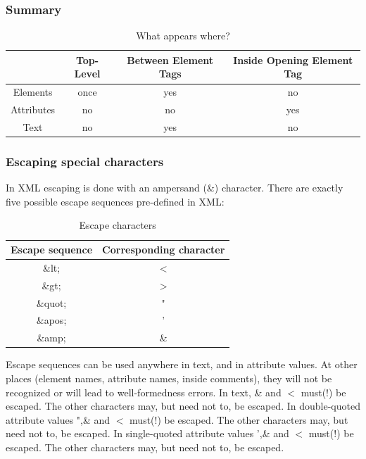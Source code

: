 \subsubsection{Summary}

\begin{table}[H]
    \centering
    \begin{tabular}{|c|c|c|c|}
        \hline
         & Top-Level & Between Element Tags & Inside Opening Element Tag \\ \hline
        Elements & once & yes & no \\ \hline
        Attributes & no & no & yes \\ \hline
        Text & no & yes & no \\ \hline
    \end{tabular}
    \caption{What appears where?}\label{tab:Waw}
\end{table}

\subsubsection{Escaping special characters}
In XML escaping is done with an ampersand (\&) character. There are exactly five possible escape sequences pre-defined in XML:
\begin{table}[H]
    \centering
    \begin{tabular}{cc}
        \hline
        Escape sequence & Corresponding character \\ \hline
        \&lt; & $<$ \\
        \&gt; & $>$ \\
        \&quot; & " \\
        \&apos; & ' \\
        \&amp; & \& \\ \hline
    \end{tabular}
    \caption{Escape characters}\label{tab:escchar}
\end{table}
Escape sequences can be used anywhere in text, and in attribute values. At other places (element names, attribute names, inside comments), they will not be recognized or will lead to well-formedness errors.
In text, \& and $<$ must(!) be escaped. The other characters may, but need not to, be escaped. In double-quoted attribute values ",\& and $<$ must(!) be escaped. The other characters may, but need not to, be escaped. In single-quoted attribute values ',\& and $<$ must(!) be escaped. The other characters may, but need not to, be escaped.

